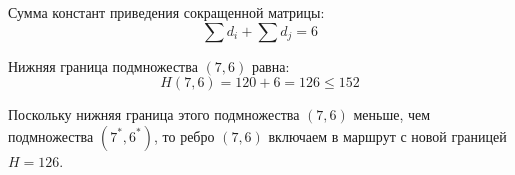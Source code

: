 \documentclass[17pt]{extarticle}
\begin{document}
Сумма констант приведения сокращенной матрицы:
\[ \sum d_i + \sum d_j = 6 \]

Нижняя граница подмножества \( (7,6) \) равна:
\[ H(7,6) = 120 + 6 = 126 \leq 152 \]

Поскольку нижняя граница этого подмножества \( (7,6) \) меньше, чем подмножества \( (7^*,6^*) \), то ребро \( (7,6) \) включаем в маршрут с новой границей \( H = 126 \).
\end{document}
